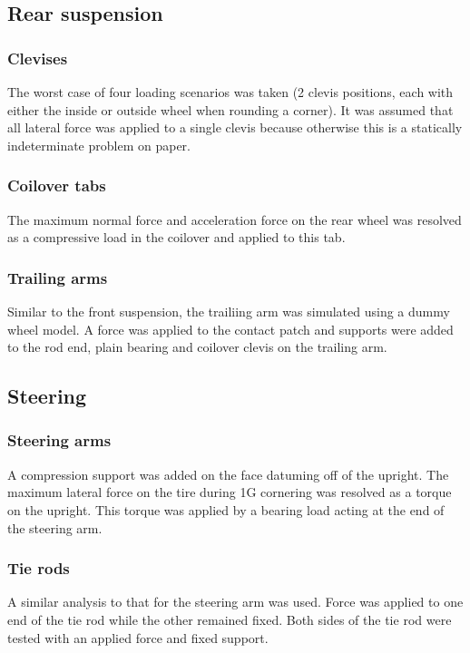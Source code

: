 \documentclass[10pt]{article}
\begin{document}
\subsection{Rear suspension}
\subsubsection{Clevises}
The worst case of four loading scenarios was taken (2 clevis positions, each with either the inside or outside wheel when rounding a corner). It was assumed that all lateral force was applied to a single clevis because otherwise this is a statically indeterminate problem on paper.

\subsubsection{Coilover tabs}
The maximum normal force and acceleration force on the rear wheel was resolved as a compressive load in the coilover and applied to this tab.

\subsubsection{Trailing arms}
Similar to the front suspension, the trailiing arm was simulated using a dummy wheel model. A force was applied to the contact patch and supports were added to the rod end, plain bearing and coilover clevis on the trailing arm.

\subsection{Steering}
\subsubsection{Steering arms}
A compression support was added on the face datuming off of the upright. The maximum lateral force on the tire during 1G cornering was resolved as a torque on the upright. This torque was applied by a bearing load acting at the end of the steering arm.

\subsubsection{Tie rods}
A similar analysis to that for the steering arm was used. Force was applied to one end of the tie rod while the other remained fixed. Both sides of the tie rod were tested with an applied force and fixed support.
\end{document}
